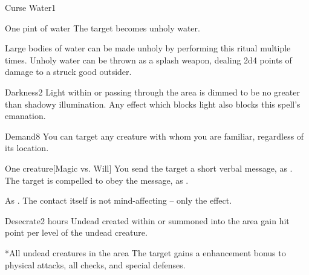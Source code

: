 \begin{spellsection}{Curse Water}{1}
\begin{spelltarget}{One pint of water}
    \spelleffect The target becomes unholy water. 
\end{spelltarget}
\spellnotes Large bodies of water can be made unholy by performing this ritual multiple times. Unholy water can be thrown as a splash weapon, dealing 2d4 points of damage to a struck good outsider.
\end{spellsection}

\begin{spellsection}{Darkness}{2}
\spellrng{\rngtouch}
\spelldur \durlong \dismissable
{}
\spellline
\spelleffect Light within or passing through the area is dimmed to be no greater than shadowy illumination.
\spellnotes Any effect which blocks light also blocks this spell's emanation.
\end{spellsection}

\begin{spellsection}{Demand}{8}
\spellspecial You can target any creature with whom you are familiar, regardless of its location.
\begin{spelltarget}{One creature}[Magic vs. Will]
    \spelleffect You send the target a short verbal message, as .
    \spellsuccess The target is compelled to obey the message, as .
\end{spelltarget}
\spellnotes As .
\spellnotes The contact itself is not mind-affecting -- only the  effect.
\end{spellsection}

\begin{spellsection}{Desecrate}{2}
 hours
\spellline
\spelleffect Undead created within or summoned into the area gain  hit point per level of the undead creature.
\begin{spelltarget}*{All undead creatures in the area}
    \spelleffect The target gains a  enhancement bonus to physical attacks, all checks, and special defenses.
\end{spelltarget}
\end{spellsection}

